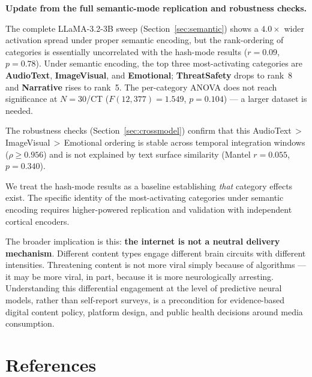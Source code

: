 \documentclass[11pt,letterpaper]{article}
\begin{document}
\begin{quotebox}
\textbf{Update from the full semantic-mode replication and robustness checks.}

The complete LLaMA-3.2-3B sweep (Section~\ref{sec:semantic}) shows a $4.0\times$ wider activation spread under proper semantic encoding, but the rank-ordering of categories is essentially uncorrelated with the hash-mode results ($r=0.09$, $p=0.78$). Under semantic encoding, the top three most-activating categories are \textbf{AudioText}, \textbf{ImageVisual}, and \textbf{Emotional}; \textbf{ThreatSafety} drops to rank~8 and \textbf{Narrative} rises to rank~5. The per-category ANOVA does not reach significance at $N=30$/CT ($F(12,377)=1.549$, $p=0.104$) --- a larger dataset is needed.

The robustness checks (Section~\ref{sec:crossmodel}) confirm that this AudioText\,$>$\,ImageVisual\,$>$\,Emotional ordering is stable across temporal integration windows ($\rho \geq 0.956$) and is not explained by text surface similarity (Mantel $r=0.055$, $p=0.340$).

We treat the hash-mode results as a baseline establishing \textit{that} category effects exist. The specific identity of the most-activating categories under semantic encoding requires higher-powered replication and validation with independent cortical encoders.
\end{quotebox}

The broader implication is this: \textbf{the internet is not a neutral delivery mechanism}. Different content types engage different brain circuits with different intensities. Threatening content is not more viral simply because of algorithms --- it may be more viral, in part, because it is more neurologically arresting. Understanding this differential engagement at the level of predictive neural models, rather than self-report surveys, is a precondition for evidence-based digital content policy, platform design, and public health decisions around media consumption.

\FloatBarrier
\clearpage
\section*{References}

\small
\setlength{\parindent}{0pt}
\setlength{\parskip}{4pt}
\end{document}
